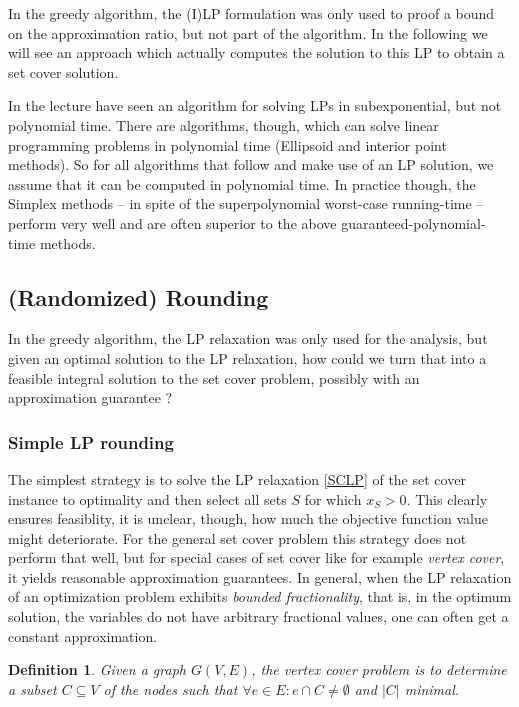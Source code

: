 \documentclass{article}
\newtheorem{definition}{Definition}
\begin{document}
In the greedy algorithm, the (I)LP formulation was only used to proof a bound on the approximation ratio, but not part of
the algorithm. In the following we will see an approach which actually computes the solution to this LP to obtain
a set cover solution.

 In the lecture have seen an algorithm for solving LPs in subexponential, but not polynomial time. There are
algorithms, though, which can solve linear programming problems in polynomial time (Ellipsoid and interior point methods).
So for all algorithms that follow and make use of an LP solution, we assume that it can be computed in polynomial time.
In practice though, the Simplex methods -- in spite of the superpolynomial worst-case running-time -- perform very well
and are often superior to the above guaranteed-polynomial-time methods.

\subsection{(Randomized) Rounding}
In the greedy algorithm, the LP relaxation was only used for the analysis, but given an optimal solution to the LP relaxation, how could we turn that into a feasible integral solution to the set cover problem, possibly with an approximation guarantee ?

\subsubsection{Simple LP rounding}
The simplest strategy is to solve the  LP relaxation \ref{SCLP} of the  set cover instance to optimality and then select all sets $S$ for which $x_S>0$. This clearly ensures feasiblity, it is unclear, though, how much the objective function value might deteriorate. 
For the general set cover problem this strategy does not perform that well, but for special cases of set cover like for example \emph{vertex cover}, it yields reasonable approximation guarantees. In general, when the LP relaxation of an optimization problem exhibits \emph{bounded fractionality}, that is, in the optimum solution, the variables do not have arbitrary fractional values, one can often get a constant approximation.

\begin{definition}
Given a graph $G(V,E)$, the \emph{vertex cover} problem is to determine a subset $C\subseteq V$ of the nodes
such that $\forall e\in E: e\cap C\neq \emptyset$ and $|C|$ minimal.
\end{definition}
\end{document}
